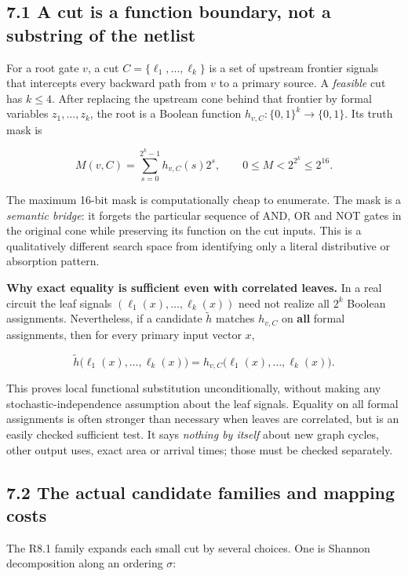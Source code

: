 \subsection{7.1 A cut is a function boundary, not a substring of the netlist}\label{a-cut-is-a-function-boundary-not-a-substring-of-the-netlist}

For a root gate \(v\), a cut \(C=\{\ell_1,\ldots,\ell_k\}\) is a set of upstream frontier signals that intercepts every backward path from \(v\) to a primary source. A \emph{feasible} cut has \(k\le4\). After replacing the upstream cone behind that frontier by formal variables \(z_1,\ldots,z_k\), the root is a Boolean function \(h_{v,C}:\{0,1\}^k\rightarrow\{0,1\}\). Its truth mask is

\[
M(v,C)=\sum_{s=0}^{2^k-1} h_{v,C}(s)2^s,
\qquad 0\le M<2^{2^k}\le2^{16}.
\]

The maximum 16-bit mask is computationally cheap to enumerate. The mask is a \emph{semantic bridge}: it forgets the particular sequence of AND, OR and NOT gates in the original cone while preserving its function on the cut inputs. This is a qualitatively different search space from identifying only a literal distributive or absorption pattern.

\textbf{Why exact equality is sufficient even with correlated leaves.} In a real circuit the leaf signals \((\ell_1(x),\ldots,\ell_k(x))\) need not realize all \(2^k\) Boolean assignments. Nevertheless, if a candidate \(\tilde h\) matches \(h_{v,C}\) on \textbf{all} formal assignments, then for every primary input vector \(x\),

\[
\tilde h\bigl(\ell_1(x),\ldots,\ell_k(x)\bigr)
=h_{v,C}\bigl(\ell_1(x),\ldots,\ell_k(x)\bigr).
\]

This proves local functional substitution unconditionally, without making any stochastic-independence assumption about the leaf signals. Equality on all formal assignments is often stronger than necessary when leaves are correlated, but is an easily checked sufficient test. It says \emph{nothing by itself} about new graph cycles, other output uses, exact area or arrival times; those must be checked separately.

\subsection{7.2 The actual candidate families and mapping costs}\label{the-actual-candidate-families-and-mapping-costs}

The R8.1 family expands each small cut by several choices. One is Shannon decomposition along an ordering \(\sigma\):

